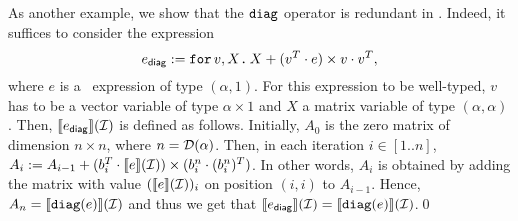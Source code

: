 %
\begin{example}\label{ex:diag}
As another example, we show that the $\texttt{diag}$ operator is redundant in \langfor.
Indeed, it suffices to consider the expression
$$e_{\mathsf{diag}}:=
\texttt{for}\, v,X \texttt{.}\, X + (v^T\cdot e) \times v\cdot v^T,$$ where $e$ is a \langfor\  expression of type $(\alpha,1)$. For this expression to be well-typed, $v$ has to be a vector variable of type $\alpha\times 1$ and $X$ a matrix variable of type $(\alpha,\alpha)$. Then, $\llbracket e_{\mathsf{diag}} \rrbracket(\mathcal{I})$ is defined as follows.
Initially, $A_0$ is the zero matrix of dimension $n\times n$, where $n=\mathcal{D}(\alpha)$. Then, in each iteration
$i\in[1..n]$, $A_{i}:=A_{i-1}+  (b_i^T\cdot\llbracket e \rrbracket(\mathcal{I}))\times (b_i^n\cdot (b_i^n)^T)$. In other words, $A_i$ is obtained by adding the matrix with value $(\llbracket e \rrbracket(\mathcal{I}))_i$ on position $(i,i)$ to $A_{i-1}$. Hence, $A_n=\llbracket \texttt{diag}(e) \rrbracket(\mathcal{I})$ and
thus we get that $\llbracket e_{\mathsf{diag}} \rrbracket(\mathcal{I})=\llbracket \texttt{diag}(e) \rrbracket(\mathcal{I})$.\qed%
 \end{example}
%

